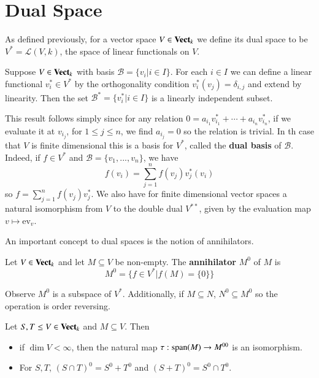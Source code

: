 \section{Dual Space}\label{sec:dual}

As defined previously, for a vector space $V \in \normalfont\textbf{Vect}_{k}$ we define its dual space to be $V^* = \mathcal{L}(V,k)$, the space of linear functionals on $V$.

\begin{theorem}
    Suppose $V \in \normalfont\textbf{Vect}_{k}$ with basis $\mathcal{B} = \{v_i|i \in I\}$. For each $i \in I$ we can define a linear functional $v_i^* \in V^*$ by the orthogonality condition $v_i^*(v_j) = \delta_{i,j}$ and extend by linearity. Then the set $\mathcal{B}^* = \{v_i^*|i\in I\}$ is a linearly independent subset.
\end{theorem}

This result follows simply since for any relation $0 = a_{i_1}v_{i_1}^*+\cdots+a_{i_n}v_{i_n}^*$, if we evaluate it at $v_{i_j}$, for $1\leq j \leq n$, we find $a_{i_j} = 0$ so the relation is trivial. In th case that $V$ is finite dimensional this is a basis for $V^*$, called the \textbf{dual basis} of $\mathcal{B}$. Indeed, if $f \in V^*$ and $\mathcal{B} = \{v_1,...,v_n\}$, we have \begin{equation*}
    f(v_i) = \sum_{j=1}^nf(v_j)v_j^*(v_i)
\end{equation*}
so $f = \sum_{j=1}^nf(v_j)v_j^*$. We also have for finite dimensional vector spaces a natural isomorphism from $V$ to the double dual $V^{**}$, given by the evaluation map $v \mapsto \text{ev}_v$.

An important concept to dual spaces is the notion of annihilators.

\begin{definition}
    Let $V \in \normalfont\textbf{Vect}_{k}$ and let $M \subseteq V$ be non-empty. The \textbf{annihilator} $M^0$ of $M$ is \begin{equation*}
        M^0 = \{f \in V^*|f(M) = \{0\}\}
    \end{equation*}
\end{definition}

Observe $M^0$ is a subspace of $V^*$. Additionally, if $M \subseteq N$, $N^0 \subseteq M^0$ so the operation is order reversing. 

\begin{theorem}
    Let $S,T \leq V \in \normalfont\textbf{Vect}_{k}$ and $M \subseteq V$. Then \begin{itemize}
        \item if $\dim V < \infty$, then the natural map $\tau:\operatorname{span}(M)\rightarrow M^{00}$ is an isomorphism.
        \item For $S,T$, $(S\cap T)^0 = S^0+T^0$ and $(S+T)^0 = S^0\cap T^0$.
    \end{itemize}
\end{theorem}



